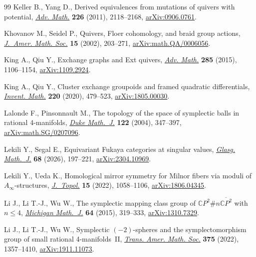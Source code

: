 \documentclass[pdftex]{sigma}
\theoremstyle{definition}
\numberwithin{equation}{section}
\begin{document}
\begin{thebibliography}{99}
Keller B., Yang D., Derived equivalences from mutations of quivers with
 potential, \href{https://doi.org/10.1016/j.aim.2010.09.019}{\textit{Adv.
 Math.}} \textbf{226} (2011), 2118--2168,
 \href{http://arxiv.org/abs/0906.0761}{arXiv:0906.0761}.

Khovanov M., Seidel P., Quivers, {F}loer cohomology, and braid group actions,
 \href{https://doi.org/10.1090/S0894-0347-01-00374-5}{\textit{J.~Amer. Math.
 Soc.}} \textbf{15} (2002), 203--271,
 \href{http://arxiv.org/abs/math.QA/0006056}{arXiv:math.QA/0006056}.

King A., Qiu Y., Exchange graphs and {E}xt quivers,
 \href{https://doi.org/10.1016/j.aim.2015.08.017}{\textit{Adv. Math.}}
 \textbf{285} (2015), 1106--1154,
 \href{http://arxiv.org/abs/1109.2924}{arXiv:1109.2924}.

King A., Qiu Y., Cluster exchange groupoids and framed quadratic differentials,
 \href{https://doi.org/10.1007/s00222-019-00932-y}{\textit{Invent. Math.}}
 \textbf{220} (2020), 479--523,
 \href{http://arxiv.org/abs/1805.00030}{arXiv:1805.00030}.

Lalonde F., Pinsonnault M., The topology of the space of symplectic balls in
 rational 4-manifolds,
 \href{https://doi.org/10.1215/S0012-7094-04-12223-7}{\textit{Duke Math.~J.}}
 \textbf{122} (2004), 347--397,
 \href{http://arxiv.org/abs/math.SG/0207096}{arXiv:math.SG/0207096}.

Lekili Y., Segal E., Equivariant {F}ukaya categories at singular values,
 \href{https://doi.org/10.1017/s0017089525100487}{\textit{Glasg. Math.~J.}}
 \textbf{68} (2026), 197--221,
 \href{http://arxiv.org/abs/2304.10969}{arXiv:2304.10969}.

Lekili Y., Ueda K., Homological mirror symmetry for {M}ilnor fibers via moduli
 of {$A_\infty$}-structures,
 \href{https://doi.org/10.1112/topo.12248}{\textit{J.~Topol.}} \textbf{15}
 (2022), 1058--1106, \href{http://arxiv.org/abs/1806.04345}{arXiv:1806.04345}.

Li J., Li T.-J., Wu W., The symplectic mapping class group of {$\mathbb
 CP^2\#n\overline{\mathbb CP^2}$} with {$n \le 4$},
 \href{https://doi.org/10.1307/mmj/1434731926}{\textit{Michigan Math.~J.}}
 \textbf{64} (2015), 319--333,
 \href{http://arxiv.org/abs/1310.7329}{arXiv:1310.7329}.

Li J., Li T.-J., Wu W., Symplectic {$(-2)$}-spheres and the symplectomorphism
 group of small rational 4-manifolds~{II},
 \href{https://doi.org/10.1090/tran/8517}{\textit{Trans. Amer. Math. Soc.}}
 \textbf{375} (2022), 1357--1410,
 \href{http://arxiv.org/abs/1911.11073}{arXiv:1911.11073}.


\end{thebibliography}
\end{document}
